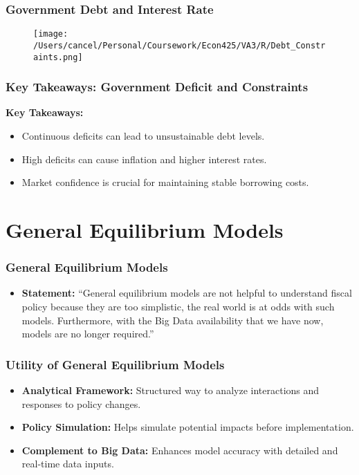 \documentclass{beamer}
\begin{document}
\begin{frame}
    \frametitle{Government Debt and Interest Rate}
    \begin{figure}[h!]
        \centering
        \texttt{[image: /Users/cancel/Personal/Coursework/Econ425/VA3/R/Debt\_Constraints.png]}
    \end{figure}
\end{frame}

\begin{frame}
    \frametitle{Key Takeaways: Government Deficit and Constraints}
    \textbf{Key Takeaways:}
    \begin{itemize}
        \item Continuous deficits can lead to unsustainable debt levels.
        \item High deficits can cause inflation and higher interest rates.
        \item Market confidence is crucial for maintaining stable borrowing costs.
    \end{itemize}
\end{frame}

\section{General Equilibrium Models}

\begin{frame}
    \frametitle{General Equilibrium Models}
    \begin{itemize}
        \item \textbf{Statement:} ``General equilibrium models are not helpful to understand fiscal policy because they are too simplistic, the real world is at odds with such models. Furthermore, with the Big Data availability that we have now, models are no longer required.''
    \end{itemize}
\end{frame}

\begin{frame}
    \frametitle{Utility of General Equilibrium Models}
    \begin{itemize}
        \item \textbf{Analytical Framework:} Structured way to analyze interactions and responses to policy changes.
        \item \textbf{Policy Simulation:} Helps simulate potential impacts before implementation.
        \item \textbf{Complement to Big Data:} Enhances model accuracy with detailed and real-time data inputs.
    \end{itemize}
\end{frame}
\end{document}

